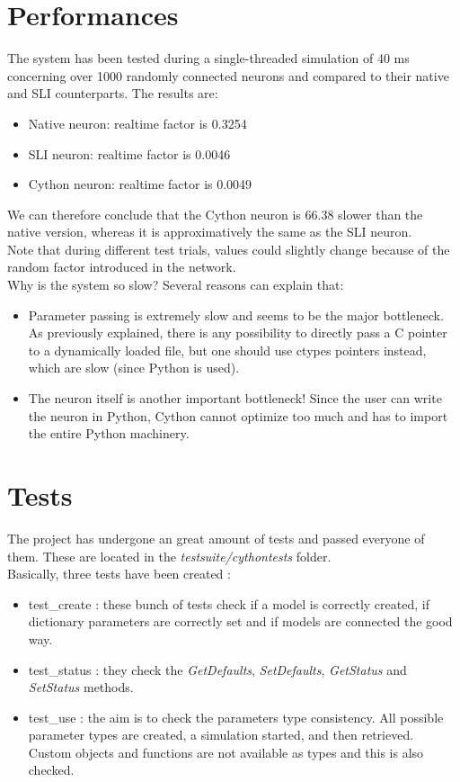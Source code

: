 \documentclass{article}
\begin{document}
\section{Performances}
The system has been tested during a single-threaded simulation of 40 ms concerning over 1000 randomly connected neurons and compared to their native and SLI counterparts. The results are:
\begin{itemize}
\item Native neuron: realtime factor is 0.3254
\item SLI neuron: realtime factor is 0.0046
\item Cython neuron: realtime factor is 0.0049
\end{itemize}
We can therefore conclude that the Cython neuron is 66.38 slower than the native version, whereas it is approximatively the same as the SLI neuron.\\
Note that during different test trials, values could slightly change because of the random factor introduced in the network.\\
Why is the system so slow? Several reasons can explain that:
\begin{itemize}
\item Parameter passing is extremely slow and seems to be the major bottleneck. As previously explained, there is any possibility to directly pass a C pointer to a dynamically loaded file, but one should use ctypes pointers instead, which are slow (since Python is used).
\item The neuron itself is another important bottleneck! Since the user can write the neuron in Python, Cython cannot optimize too much and has to import the entire Python machinery.
\end{itemize}
\section{Tests}
The project has undergone an great amount of tests and passed everyone of them. These are located in the \emph{testsuite/cythontests} folder. \\
Basically, three tests have been created :
\begin{itemize}
\item test\_create : these bunch of tests check if a model is correctly created, if dictionary parameters are correctly set and if models are connected the good way.
\item test\_status : they check the \emph{GetDefaults}, \emph{SetDefaults}, \emph{GetStatus} and \emph{SetStatus} methods.
\item test\_use : the aim is to check the parameters type consistency. All possible parameter types are created, a simulation started, and then retrieved. Custom objects and functions are not available as types and this is also checked.
\end{itemize}
\end{document}
